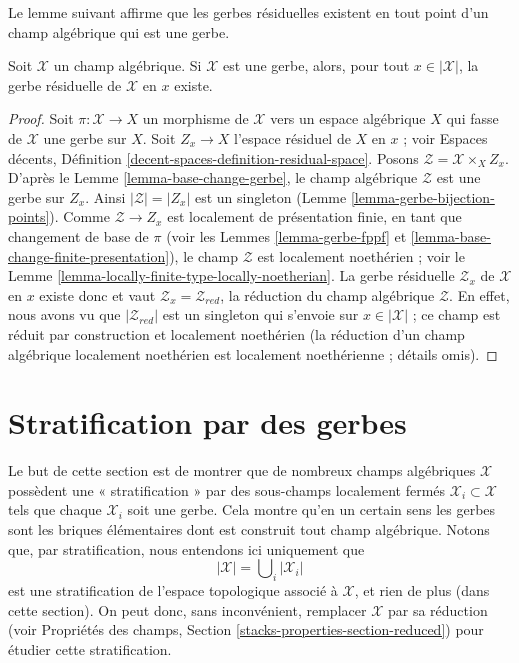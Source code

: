 \noindent
Le lemme suivant affirme que les gerbes résiduelles existent en tout point
d'un champ algébrique qui est une gerbe.

\begin{lemma}
\label{lemma-gerbe-residual-gerbe-exists}
Soit $\mathcal{X}$ un champ algébrique. Si $\mathcal{X}$ est une gerbe, alors,
pour tout $x \in |\mathcal{X}|$, la gerbe résiduelle de $\mathcal{X}$ en $x$
existe.
\end{lemma}

\begin{proof}
Soit $\pi : \mathcal{X} \to X$ un morphisme de $\mathcal{X}$ vers un espace
algébrique $X$ qui fasse de $\mathcal{X}$ une gerbe sur $X$. Soit
$Z_x \to X$ l'espace résiduel de $X$ en $x$ ; voir Espaces décents, Définition
\ref{decent-spaces-definition-residual-space}. Posons
$\mathcal{Z} = \mathcal{X} \times_X Z_x$. D'après le
Lemme \ref{lemma-base-change-gerbe}, le champ algébrique $\mathcal{Z}$ est une
gerbe sur $Z_x$. Ainsi $|\mathcal{Z}| = |Z_x|$ est un singleton
(Lemme \ref{lemma-gerbe-bijection-points}). Comme
$\mathcal{Z} \to Z_x$ est localement de présentation finie, en tant que
changement de base de $\pi$ (voir les Lemmes \ref{lemma-gerbe-fppf} et
\ref{lemma-base-change-finite-presentation}), le champ $\mathcal{Z}$ est
localement noethérien ; voir le
Lemme \ref{lemma-locally-finite-type-locally-noetherian}. La gerbe résiduelle
$\mathcal{Z}_x$ de $\mathcal{X}$ en $x$ existe donc et vaut
$\mathcal{Z}_x = \mathcal{Z}_{red}$, la réduction du champ algébrique
$\mathcal{Z}$. En effet, nous avons vu que $|\mathcal{Z}_{red}|$ est un
singleton qui s'envoie sur $x \in |\mathcal{X}|$ ; ce champ est réduit par
construction et localement noethérien (la réduction d'un champ algébrique
localement noethérien est localement noethérienne ; détails omis).
\end{proof}









\section{Stratification par des gerbes}
\label{section-stratify}

\noindent
Le but de cette section est de montrer que de nombreux champs algébriques
$\mathcal{X}$ possèdent une « stratification » par des sous-champs
localement fermés $\mathcal{X}_i \subset \mathcal{X}$ tels que chaque
$\mathcal{X}_i$ soit une gerbe. Cela montre qu'en un certain sens les gerbes
sont les briques élémentaires dont est construit tout champ algébrique.
Notons que, par stratification, nous entendons ici uniquement que
$$
|\mathcal{X}| = \bigcup\nolimits_i |\mathcal{X}_i|
$$
est une stratification de l'espace topologique associé à $\mathcal{X}$,
et rien de plus (dans cette section). On peut donc, sans inconvénient,
remplacer $\mathcal{X}$ par sa réduction (voir Propriétés des champs,
Section \ref{stacks-properties-section-reduced}) pour étudier cette
stratification.


